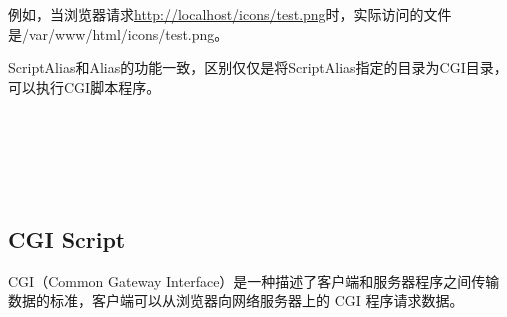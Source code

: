 例如，当浏览器请求\url{http://localhost/icons/test.png}时，实际访问的文件是/var/www/html/icons/test.png。


ScriptAlias和Alias的功能一致，区别仅仅是将ScriptAlias指定的目录为CGI目录，可以执行CGI脚本程序。


\begin{lstlisting}[language=bash]

\end{lstlisting}




\begin{lstlisting}[language=bash]

\end{lstlisting}





\begin{lstlisting}[language=bash]

\end{lstlisting}




\begin{lstlisting}[language=bash]

\end{lstlisting}





\begin{lstlisting}[language=bash]

\end{lstlisting}





\begin{lstlisting}[language=bash]

\end{lstlisting}





\begin{lstlisting}[language=bash]

\end{lstlisting}


\subsection{CGI Script}



CGI（Common Gateway Interface）是一种描述了客户端和服务器程序之间传输数据的标准，客户端可以从浏览器向网络服务器上的 CGI 程序请求数据。

